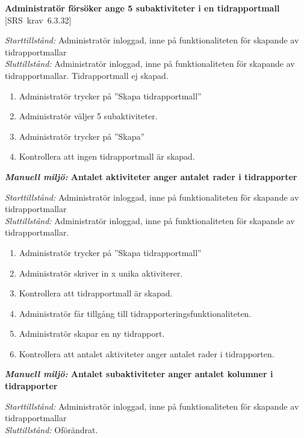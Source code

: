 \documentclass[a4paper]{article}
\def\reqinside{\hfil\penalty 100 \hfilneg \hbox}
\def \req [#1]{\reqinside{[SRS krav #1]}}
\begin{document}
\begin{FT}
\item
\textbf{Administratör försöker ange 5 subaktiviteter i en tidrapportmall} \req[6.3.32]

\emph{Starttillstånd:} Administratör inloggad, inne på funktionaliteten för skapande av tidrapportmallar\\
\emph{Sluttillstånd:} Administratör inloggad, inne på funktionaliteten för skapande av tidrapportmallar. Tidrapportmall ej skapad.\\

\begin{enumerate}
\item Administratör trycker på ''Skapa tidrapportmall''
\item Administratör väljer 5 subaktiviteter.
\item Administratör trycker på ''Skapa''
\item Kontrollera att ingen tidrapportmall är skapad.
\end{enumerate}


\item
\textbf{\emph{Manuell miljö:} Antalet aktiviteter anger antalet rader i tidrapporter}

\emph{Starttillstånd:} Administratör inloggad, inne på funktionaliteten för skapande av tidrapportmallar\\
\emph{Sluttillstånd:} Administratör inloggad, inne på funktionaliteten för skapande av tidrapportmallar.\\

\begin{enumerate}
\item Administratör trycker på ''Skapa tidrapportmall''
\item Administratör skriver in x unika aktiviterer.
\item Kontrollera att tidrapportmall är skapad.
\item Administratör får tillgång till tidrapporteringsfunktionaliteten.
\item Administratör skapar en ny tidrapport.
\item Kontrollera att antalet aktiviteter anger antalet rader i tidrapporten.
\end{enumerate}

\item
\textbf{\emph{Manuell miljö:} Antalet subaktiviteter anger antalet kolumner i tidrapporter}

\emph{Starttillstånd:} Administratör inloggad, inne på funktionaliteten för skapande av tidrapportmallar\\
\emph{Sluttillstånd:} Oförändrat.\\


\end{FT}
\end{document}
